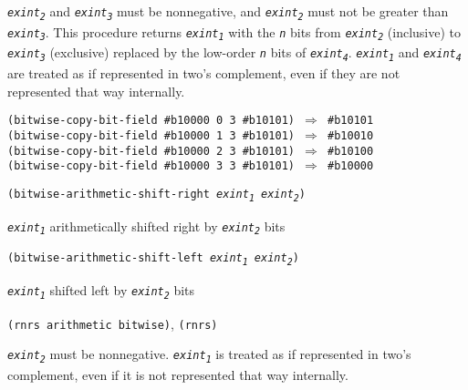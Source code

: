\texttt{\textit{exint\textsubscript{2}}} and \texttt{\textit{exint\textsubscript{3}}} must be nonnegative, and \texttt{\textit{exint\textsubscript{2}}}
must not be greater than \texttt{\textit{exint\textsubscript{3}}}.
This procedure returns \texttt{\textit{exint\textsubscript{1}}} with the \texttt{\textit{n}} bits from \texttt{\textit{exint\textsubscript{2}}} (inclusive) to
\texttt{\textit{exint\textsubscript{3}}} (exclusive) replaced by the low-order \texttt{\textit{n}} bits of \texttt{\textit{exint\textsubscript{4}}}.
\texttt{\textit{exint\textsubscript{1}}} and \texttt{\textit{exint\textsubscript{4}}} are treated as if represented in two's complement, even
if they are not represented that way internally.

\begin{alltt}
(bitwise-copy-bit-field \#{}b10000 0 3 \#{}b10101) \(\Rightarrow\) \#{}b10101
(bitwise-copy-bit-field \#{}b10000 1 3 \#{}b10101) \(\Rightarrow\) \#{}b10010
(bitwise-copy-bit-field \#{}b10000 2 3 \#{}b10101) \(\Rightarrow\) \#{}b10100
(bitwise-copy-bit-field \#{}b10000 3 3 \#{}b10101) \(\Rightarrow\) \#{}b10000
\end{alltt}

\begin{description}

\label{objects_s143}\item[procedure] \texttt{(bitwise-arithmetic-shift-right \textit{exint\textsubscript{1}} \textit{exint\textsubscript{2}})}



\item[returns] \texttt{\textit{exint\textsubscript{1}}} arithmetically shifted right by \texttt{\textit{exint\textsubscript{2}}} bits


\item[procedure] \texttt{(bitwise-arithmetic-shift-left \textit{exint\textsubscript{1}} \textit{exint\textsubscript{2}})}



\item[returns] \texttt{\textit{exint\textsubscript{1}}} shifted left by \texttt{\textit{exint\textsubscript{2}}} bits


\item[libraries] \texttt{(rnrs arithmetic bitwise)}, \texttt{(rnrs)}
\end{description}

\texttt{\textit{exint\textsubscript{2}}} must be nonnegative.
\texttt{\textit{exint\textsubscript{1}}} is treated as if represented in two's complement, even
if it is not represented that way internally.

